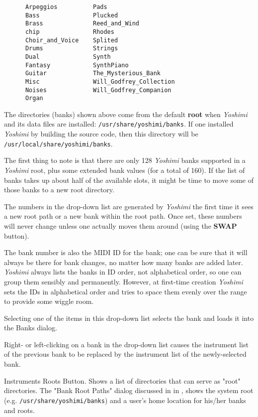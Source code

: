    \begin{verbatim}
      Arpeggios          Pads
      Bass               Plucked
      Brass              Reed_and_Wind
      chip               Rhodes
      Choir_and_Voice    Splited
      Drums              Strings
      Dual               Synth
      Fantasy            SynthPiano
      Guitar             The_Mysterious_Bank
      Misc               Will_Godfrey_Collection
      Noises             Will_Godfrey_Companion
      Organ              
   \end{verbatim}

   The directories (banks) shown above come from the default \textbf{root}
   when \textsl{Yoshimi} and its data files are installed:
   \texttt{/usr/share/yoshimi/banks}.
   If one installed \textsl{Yoshimi} by building the source code, then
   this directory will be
   \texttt{/usr/local/share/yoshimi/banks}.

   The first thing to note is that there are only 128 \textsl{Yoshimi} banks
   supported in a \textsl{Yoshimi} root, plus some extended bank values (for a
   total of 160).  If the list of banks takes up about
   half of the available slots, it might be time to move some of those banks to
   a new root directory.

   The numbers in the drop-down list are generated by \textsl{Yoshimi} the
   first time it sees a new root path or a new bank within the root path.
   Once set, these numbers will never change unless one actually moves them
   around (using the \textbf{SWAP} button).

   The bank number is also the MIDI ID for the bank;
   one can be sure that it will always
   be there for bank changes, no matter how many banks are added later.
   \textsl{Yoshimi} always lists the banks in ID order, not alphabetical
   order, so one can group them sensibly and permanently.
   However, at first-time creation \textsl{Yoshimi} sets the IDs in
   alphabetical order and tries to space them evenly over the range to
   provide some wiggle room.                                        

   Selecting one of the items in this drop-down list selects the bank and
   loads it into the Banks dialog.

   Right- or left-clicking on a bank in the drop-down list
   causes the instrument list of the previous bank to be replaced by the
   instrument list of the newly-selected bank.

   Instruments Roots Button.
   Shows a list of directories that can serve as "root" directories.
   The "Bank Root Paths" dialog discussed in
    in
   , shows
   the system root (e.g. \texttt{/usr/share/yoshimi/banks}) and
   a user's home location for his/her banks and roots.

